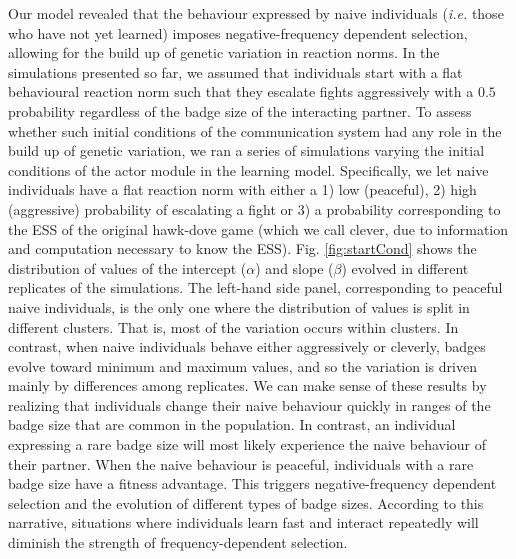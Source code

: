 \documentclass[
  12pt,
]{article}
\begin{document}
Our model revealed that the behaviour expressed by naive individuals
(\emph{i.e.} those who have not yet learned) imposes negative-frequency
dependent selection, allowing for the build up of genetic variation in
reaction norms. In the simulations presented so far, we assumed that
individuals start with a flat behavioural reaction norm such that they
escalate fights aggressively with a \(0.5\) probability regardless of
the badge size of the interacting partner. To assess whether such
initial conditions of the communication system had any role in the build
up of genetic variation, we ran a series of simulations varying the
initial conditions of the actor module in the learning model.
Specifically, we let naive individuals have a flat reaction norm with
either a 1) low (peaceful), 2) high (aggressive) probability of
escalating a fight or 3) a probability corresponding to the ESS of the
original hawk-dove game (which we call clever, due to information and
computation necessary to know the ESS). Fig. \ref{fig:startCond} shows
the distribution of values of the intercept (\(\alpha\)) and slope
(\(\beta\)) evolved in different replicates of the simulations. The
left-hand side panel, corresponding to peaceful naive individuals, is
the only one where the distribution of values is split in different
clusters. That is, most of the variation occurs within clusters. In
contrast, when naive individuals behave either aggressively or cleverly,
badges evolve toward minimum and maximum values, and so the variation is
driven mainly by differences among replicates. We can make sense of
these results by realizing that individuals change their naive behaviour
quickly in ranges of the badge size that are common in the population.
In contrast, an individual expressing a rare badge size will most likely
experience the naive behaviour of their partner. When the naive
behaviour is peaceful, individuals with a rare badge size have a fitness
advantage. This triggers negative-frequency dependent selection and the
evolution of different types of badge sizes. According to this
narrative, situations where individuals learn fast and interact
repeatedly will diminish the strength of frequency-dependent selection.
\end{document}
